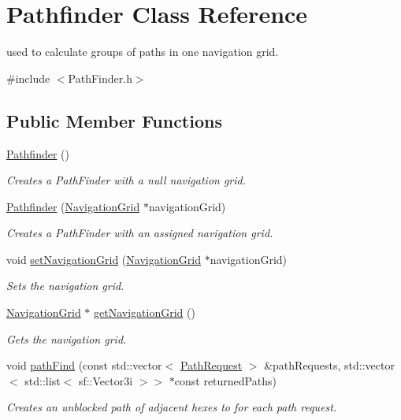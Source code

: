 \hypertarget{class_pathfinder}{}\section{Pathfinder Class Reference}
\label{class_pathfinder}


used to calculate groups of paths in one navigation grid.  




{\ttfamily \#include $<$Path\+Finder.\+h$>$}

\subsection*{Public Member Functions}
\begin{DoxyCompactItemize}
\item 
\hyperlink{class_pathfinder_af562d840858cf2b369fcee51f5069456}{Pathfinder} ()
\begin{DoxyCompactList}\small\item\em Creates a Path\+Finder with a null navigation grid. \end{DoxyCompactList}\item 
\hyperlink{class_pathfinder_ac1e4958b42424bbc9c5868cff3296e8c}{Pathfinder} (\hyperlink{class_array3_d}{Navigation\+Grid} $\ast$navigation\+Grid)
\begin{DoxyCompactList}\small\item\em Creates a Path\+Finder with an assigned navigation grid. \end{DoxyCompactList}\item 
void \hyperlink{class_pathfinder_ab2077e60f522a2d422f8b0e63cc4aa40}{set\+Navigation\+Grid} (\hyperlink{class_array3_d}{Navigation\+Grid} $\ast$navigation\+Grid)
\begin{DoxyCompactList}\small\item\em Sets the navigation grid. \end{DoxyCompactList}\item 
\hyperlink{class_array3_d}{Navigation\+Grid} $\ast$ \hyperlink{class_pathfinder_ab8d678b30e172c242923fb55f0a7a028}{get\+Navigation\+Grid} ()
\begin{DoxyCompactList}\small\item\em Gets the navigation grid. \end{DoxyCompactList}\item 
void \hyperlink{class_pathfinder_ab92e595aab257245d23dc19ff68f04fa}{path\+Find} (const std\+::vector$<$ \hyperlink{struct_path_request}{Path\+Request} $>$ \&path\+Requests, std\+::vector$<$ std\+::list$<$ sf\+::\+Vector3i $>$$>$ $\ast$const returned\+Paths)
\begin{DoxyCompactList}\small\item\em Creates an unblocked path of adjacent hexes to for each path request. \end{DoxyCompactList}\end{DoxyCompactItemize}


